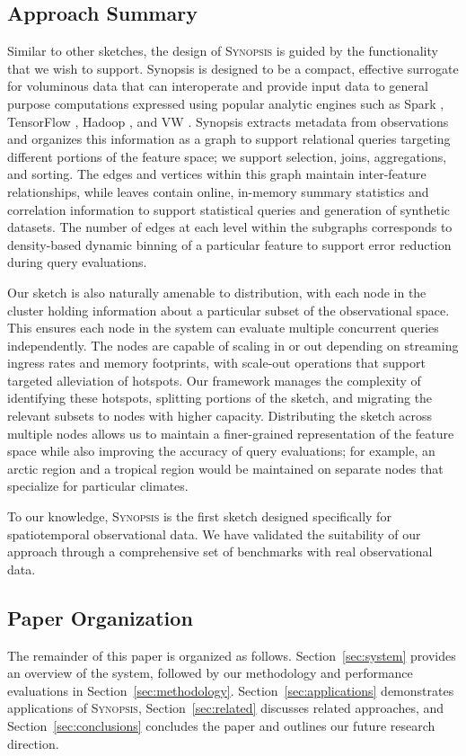\subsection{Approach Summary}
Similar to other sketches, the design of \textsc{Synopsis} is guided by the functionality that we wish to support. Synopsis is designed to be a compact, effective surrogate for voluminous data that can interoperate and provide input data to general purpose computations expressed using popular analytic engines such as Spark \cite{zaharia2010spark,armbrust2015spark}, TensorFlow \cite{abadi2016tensorflow,tensorflow}, Hadoop \cite{hadoop,shvachko2010hadoop,borthakur2008hdfs}, and VW \cite{langford2007vowpal}.   Synopsis extracts metadata from observations and organizes this information as a graph to support relational queries targeting different portions of the feature space; we support selection, joins, aggregations, and sorting. The edges and vertices within this graph maintain inter-feature relationships, while leaves contain online, in-memory summary statistics and correlation information to support statistical queries and generation of synthetic datasets.  The number of edges at each level within the subgraphs corresponds to density-based dynamic binning of a particular feature to support error reduction during query evaluations.

Our sketch is also naturally amenable to distribution, with each node in the cluster holding information about a particular subset of the observational space.  This ensures each node in the system can evaluate multiple concurrent queries independently. The nodes are capable of scaling in or out depending on streaming ingress rates and memory footprints, with scale-out operations that support targeted alleviation of hotspots. Our framework manages the complexity of identifying these hotspots, splitting portions of the sketch, and migrating the relevant subsets to nodes with higher capacity. Distributing the sketch across multiple nodes allows us to maintain a finer-grained representation of the feature space while also improving the accuracy of query evaluations; for example, an arctic region and a tropical region would be maintained on separate nodes that specialize for particular climates.

To our knowledge, \textsc{Synopsis} is the first sketch designed specifically for spatiotemporal observational data. We have validated the suitability of our approach through a comprehensive set of benchmarks with real observational data. 

\subsection{Paper Organization}
The remainder of this paper is organized as follows. Section~\ref{sec:system} provides an overview of the system, followed by our methodology and performance evaluations in Section~\ref{sec:methodology}. Section~\ref{sec:applications} demonstrates applications of \textsc{Synopsis}, Section~\ref{sec:related} discusses related approaches, and Section~\ref{sec:conclusions} concludes the paper and outlines our future research direction.
